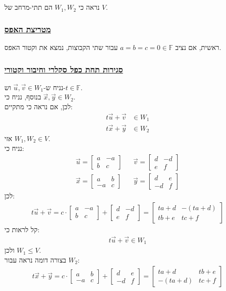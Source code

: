 \documentclass[a4paper, 12pt, leqno]{article}
\newcommand{\sub}[1]{\subsection{\underline{#1}}}
\newcommand{\subsub}[1]{\subsubsection{\underline{#1}}}
\newcommand{\F}{\ensuremath{\mathbb{F}}}
\newcommand{\eq}[1]{\begin{align*}#1\end{align*}}
\renewcommand{\leq}{\leqslant}
\begin{document}
\setcounter{section}{26}
\section{}
\setcounter{equation}{0}
\sub{}
נראה כי $W_1,W_2$ הם תתי-מרחב של $V$.
\subsub{מטריצת האפס}
ראשית, אם נציב $a=b=c=0\in\F$ עבור שתי הקבוצות, נמצא את וקטור האפס.
\subsub{סגירות תחת כפל סקלרי וחיבור וקטורי}
נניח ש-$\vec{u},\vec{v}\in{W_1}$ וש-$t\in\F$.\\
בנוסף, נניח כי $\vec{x},\vec{y}\in{W_2}$.\\
לכן, אם נראה כי מתקיים:
\eq{
    t\vec{u}+\vec{v}&\in{W_1}\\
    t\vec{x}+\vec{y}&\in{W_2}
}
אזי $W_1,W_2\in{V}$.\\
נניח כי:
\eq{
    \vec{u}=
    \begin{bmatrix}
        a & -a\\
        b & c
    \end{bmatrix}
    &&
    \vec{v}=
    \begin{bmatrix}
        d & -d\\
        e & f
    \end{bmatrix}
    \\
    \vec{x}=
    \begin{bmatrix}
        a & b\\
        -a & c
    \end{bmatrix}
    &&
    \vec{y}=
    \begin{bmatrix}
        d & e\\
        -d & f
    \end{bmatrix}
}
לכן:
\eq{
    t\vec{u}+\vec{v}=c\cdot \begin{bmatrix}
        a & -a\\
        b & c
    \end{bmatrix}
    +
    \begin{bmatrix}
        d & -d\\
        e & f
    \end{bmatrix}
    =
    \begin{bmatrix}
        ta+d & -(ta+d)\\
        tb+e & tc+f
    \end{bmatrix}
}
קל לראות כי:
\eq{
    t\vec{u}+\vec{v}\in{W_1}
}
ולכן $W_1\leq{V}$.\\
בצורה דומה נראה עבור $W_2$:
\eq{
    t\vec{x}+\vec{y}=c\cdot \begin{bmatrix}
        a & b\\
        -a & c
    \end{bmatrix}
    +
    \begin{bmatrix}
        d & e\\
        -d & f
    \end{bmatrix}
    =
    \begin{bmatrix}
        ta+d & tb+e\\
        -(ta+d) & tc+f
    \end{bmatrix}
}
\end{document}
